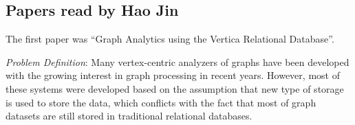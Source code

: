 

\subsection{Papers read by Hao Jin}

The first paper was ``Graph Analytics using the Vertica Relational Database''.

\begin{itemize*}
\item {\em Problem Definition}: Many vertex-centric analyzers of graphs have been developed with the growing interest in graph processing in recent years. However, most of these systems were developed based on the assumption that new type of storage is used to store the data, which conflicts with the fact that most of graph datasets are still stored in traditional relational databases.


\end{itemize*}
